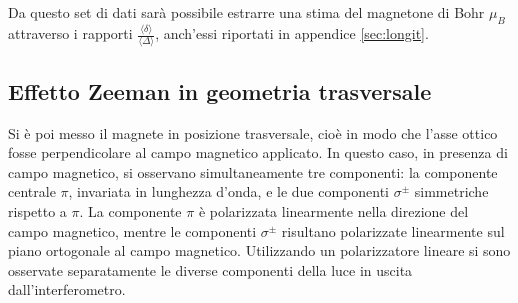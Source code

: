Da questo set di dati sarà possibile estrarre una stima del magnetone di Bohr $\mu_B$ attraverso
i rapporti $\frac{\langle\delta\rangle}{\langle\Delta\rangle}$, anch'essi riportati in appendice
\ref{sec:longit}.
\subsection{Effetto Zeeman in geometria trasversale}

Si è poi messo il magnete in posizione trasversale, cioè in modo che l’asse ottico fosse perpendicolare al campo magnetico applicato. In questo caso, in presenza di campo magnetico, si osservano simultaneamente tre componenti: la componente centrale $\pi$, invariata in lunghezza d'onda, e le due componenti $\sigma^{\pm}$ simmetriche rispetto a $\pi$. La componente $\pi$ è polarizzata linearmente nella direzione del campo magnetico, mentre le componenti $\sigma^{\pm}$ risultano polarizzate linearmente sul piano ortogonale al campo magnetico.
Utilizzando un polarizzatore lineare si sono osservate separatamente le diverse componenti della luce in uscita dall'interferometro.

